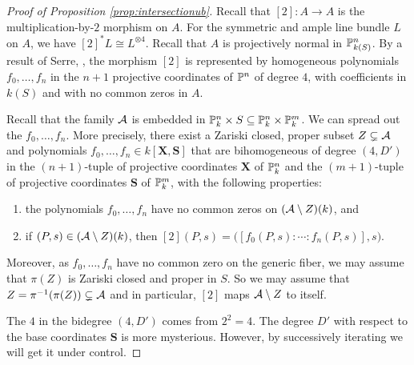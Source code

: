 \begin{proof}[Proof of Proposition \ref{prop:intersectionub}] Recall that $[2] \colon
A \rightarrow A$  is the  multiplication-by-$2$ morphism on $A$. For the symmetric and ample line bundle
$L$ on $A$, we have $[2]^*L \cong L^{\otimes 4}$.
Recall that $A$ is projectively normal in ${\mathbb{P}}_{k(S)}^n$. 
By a result of Serre, \cite[Corollaire~2, Appendix~II]{Ast6970}, 
the morphism $[2]$ is represented 
 by homogeneous
polynomials $f_0,\ldots,f_n$ in the $n+1$ projective coordinates of ${\mathbb{P}}^n$ of degree $4$, with  coefficients in $k(S)$ and with no common
zeros in $A$. 

Recall that the family $\mathcal{A}$ is embedded in
${\mathbb{P}}_k^n\times S \subseteq{\mathbb{P}}_k^n\times{\mathbb{P}}_k^m$. We can spread out the
$f_0,\ldots,f_n$. More precisely, there exist a Zariski closed, proper
subset $Z\subsetneq \mathcal{A}$ and polynomials $f_0,\ldots,f_n \in
k[\mathbf{X},\mathbf{S}]$ that are bihomogeneous of degree $(4,D')$ in
 the $(n+1)$-tuple of projective coordinates $\mathbf{X}$ of
${\mathbb{P}}_k^n$
and the $(m+1)$-tuple of projective coordinates $\mathbf{S}$ of
${\mathbb{P}}_k^m$,
 with the following properties:
\begin{enumerate}
 \item [(i)] the polynomials $f_0,\ldots,f_n$ have no common zeros on
 $(\mathcal{A}\setminus Z)(k)$, and 
 \item[(ii)]  if   $(P,s)\in(\mathcal{A}\setminus Z)(k)$, then $[2](P,s) = \bigl([f_0(P,s):\cdots : f_n(P,s)],s\bigr)$. 
\end{enumerate}
Moreover, as $f_0,\ldots,f_n$ have no common zero on the generic
fiber, we may assume that $\pi(Z)$ is Zariski closed and proper in
$S$. So we may assume that $Z = \pi^{-1}(\pi(Z))\subsetneq \mathcal{A}$ and in particular,
$[2]$ maps $\mathcal{A}\setminus Z$ to itself.

The  $4$ in the bidegree $(4,D')$ comes from $2^2=4$. The degree
$D'$ with respect to the base coordinates $\mathbf{S}$ is more mysterious. However,
by successively iterating we will get it under control. 



\end{proof}
